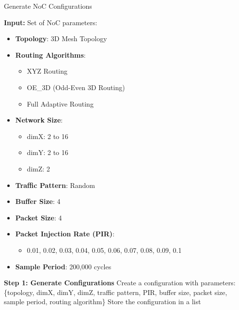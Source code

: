 \documentclass[conference]{IEEEtran}
\begin{document}
\begin{algorithm}[H]
\caption{Generate NoC Configurations}
\label{algo_step1}
\begin{algorithmic}[1]
    \State \textbf{Input:} Set of NoC parameters:
        \begin{itemize}
            \item \textbf{Topology}: 3D Mesh Topology
            \item \textbf{Routing Algorithms}: 
                \begin{itemize}
                    \item XYZ Routing
                    \item OE\_3D (Odd-Even 3D Routing)
                    \item Full Adaptive Routing
                \end{itemize}
            \item \textbf{Network Size}: 
                \begin{itemize}
                    \item dimX: 2 to 16
                    \item dimY: 2 to 16
                    \item dimZ: 2
                \end{itemize}
            \item \textbf{Traffic Pattern}: Random
            \item \textbf{Buffer Size}: 4 
            \item \textbf{Packet Size}: 4
            \item \textbf{Packet Injection Rate (PIR)}: 
                \begin{itemize}
                    \item 0.01, 0.02, 0.03, 0.04, 0.05, 0.06, 0.07, 0.08, 0.09, 0.1
                \end{itemize}
            \item \textbf{Sample Period}: 200,000 cycles
        \end{itemize}
        
    \State \textbf{Step 1: Generate Configurations}
                    \State Create a configuration with parameters: 
                        \{topology, dimX, dimY, dimZ, traffic pattern, PIR, buffer size, packet size, sample period, routing algorithm\}
                    \State Store the configuration in a list
                \EndFor
            \EndFor
        \EndFor
    \EndFor
\end{algorithmic}
\end{algorithm}
\end{document}
